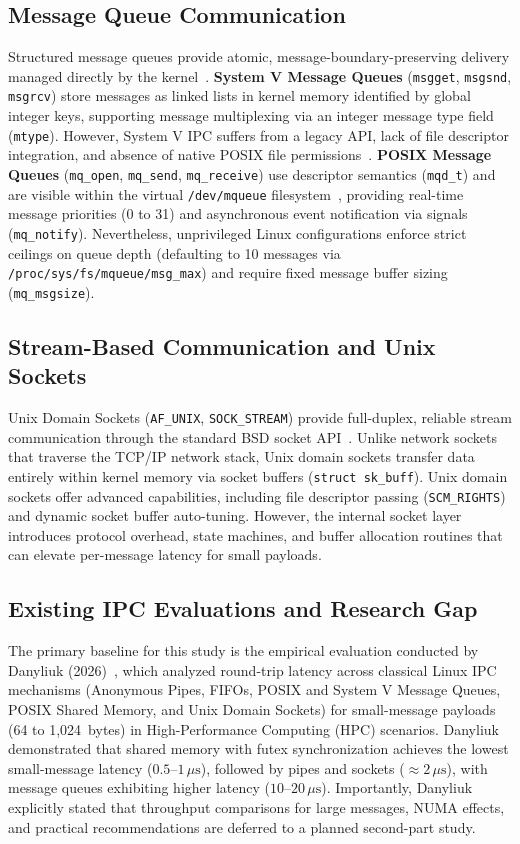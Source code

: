 \subsection{Message Queue Communication}
Structured message queues provide atomic, message-boundary-preserving delivery managed directly by the kernel~\cite{kerrisk2010linux}. 
\textbf{System V Message Queues} (\texttt{msgget}, \texttt{msgsnd}, \texttt{msgrcv}) store messages as linked lists in kernel memory identified by global integer keys, supporting message multiplexing via an integer message type field (\texttt{mtype}). However, System V IPC suffers from a legacy API, lack of file descriptor integration, and absence of native POSIX file permissions~\cite{stevens1999unixipc}.
\textbf{POSIX Message Queues} (\texttt{mq\_open}, \texttt{mq\_send}, \texttt{mq\_receive}) use descriptor semantics (\texttt{mqd\_t}) and are visible within the virtual \texttt{/dev/mqueue} filesystem~\cite{posix2018standard}, providing real-time message priorities (0 to 31) and asynchronous event notification via signals (\texttt{mq\_notify}). Nevertheless, unprivileged Linux configurations enforce strict ceilings on queue depth (defaulting to 10 messages via \texttt{/proc/sys/fs/mqueue/msg\_max}) and require fixed message buffer sizing (\texttt{mq\_msgsize}).

\subsection{Stream-Based Communication and Unix Sockets}
Unix Domain Sockets (\texttt{AF\_UNIX}, \texttt{SOCK\_STREAM}) provide full-duplex, reliable stream communication through the standard BSD socket API~\cite{stevens2004unix}. Unlike network sockets that traverse the TCP/IP network stack, Unix domain sockets transfer data entirely within kernel memory via socket buffers (\texttt{struct sk\_buff}). Unix domain sockets offer advanced capabilities, including file descriptor passing (\texttt{SCM\_RIGHTS}) and dynamic socket buffer auto-tuning. However, the internal socket layer introduces protocol overhead, state machines, and buffer allocation routines that can elevate per-message latency for small payloads.

\subsection{Existing IPC Evaluations and Research Gap}
The primary baseline for this study is the empirical evaluation conducted by Danyliuk (2026)~\cite{danyliuk2026classical}, which analyzed round-trip latency across classical Linux IPC mechanisms (Anonymous Pipes, FIFOs, POSIX and System V Message Queues, POSIX Shared Memory, and Unix Domain Sockets) for small-message payloads (64 to 1,024~bytes) in High-Performance Computing (HPC) scenarios. Danyliuk demonstrated that shared memory with futex synchronization achieves the lowest small-message latency ($0.5\text{--}1\,\mu\text{s}$), followed by pipes and sockets ($\approx 2\,\mu\text{s}$), with message queues exhibiting higher latency ($10\text{--}20\,\mu\text{s}$). Importantly, Danyliuk explicitly stated that throughput comparisons for large messages, NUMA effects, and practical recommendations are deferred to a planned second-part study.

